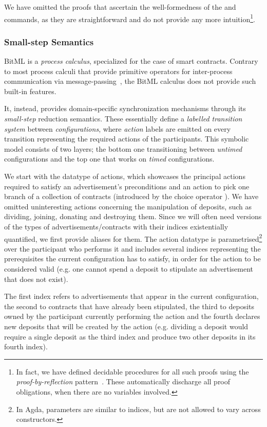 \documentclass[acmsmall,nonacm=true,screen=true]{acmart}
\begin{document}
We have omitted the proofs that ascertain the well-formedness of the \inlinePut{} and \inlineSplit{} commands, as
they are straightforward and do not provide any more intuition\footnote{
In fact, we have defined decidable procedures for all such proofs using the
\textit{proof-by-reflection} pattern~\cite{proofbyreflection}.
These automatically discharge all proof obligations, when there are no variables involved.}.

\subsubsection{Small-step Semantics}
BitML is a \textit{process calculus}, specialized for the case of smart contracts.
Contrary to most process calculi that provide primitive operators for inter-process communication via
message-passing~\cite{csp}, the BitML calculus does not provide such built-in features.

It, instead, provides domain-specific synchronization mechanisms through its \textit{small-step} reduction semantics.
These essentially define a \textit{labelled transition system} between \textit{configurations}, where
\textit{action} labels are emitted on every transition representing the required actions of the participants.
This symbolic model consists of two layers; the bottom one transitioning between \textit{untimed} configurations and the top one
that works on \textit{timed} configurations.

We start with the datatype of actions, which showcases the principal actions required to satisfy an advertisement's preconditions
and an action to pick one branch of a collection of contracts (introduced by the choice operator \inlineOplus{}).
We have omitted uninteresting actions concerning the manipulation of deposits, such as dividing, joining, donating and destroying them.
Since we will often need versions of the types of advertisements/contracts with their
indices existentially quantified, we first provide aliases for them.
\BITactions{}
The action datatype is parametrised\footnote{
In Agda, parameters are similar to indices, but are not allowed to vary across constructors.
}
over the participant who performs it
and includes several indices representing the prerequisites the current configuration has to satisfy, in order for
the action to be considered valid (e.g. one cannot spend a deposit to stipulate an advertisement that does not exist).

The first index refers to advertisements that appear in the current configuration, the second to contracts that have
already been stipulated, the third to deposits owned by the participant currently performing the action and the fourth
declares new deposits that will be created by the action
(e.g. dividing a deposit would require a single deposit as the third index and produce two other deposits in its fourth index).
\end{document}

